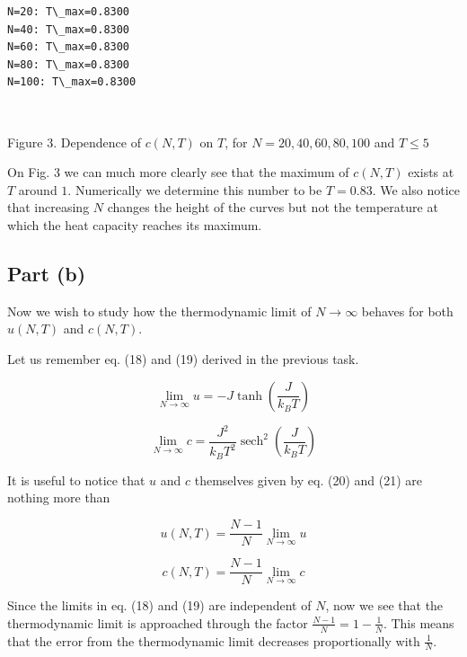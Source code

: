 ﻿\documentclass[11pt]{article}
\begin{document}
    \begin{Verbatim}[commandchars=\\\{\}]
N=20: T\_max=0.8300
N=40: T\_max=0.8300
N=60: T\_max=0.8300
N=80: T\_max=0.8300
N=100: T\_max=0.8300
    \end{Verbatim}

    \begin{center}
    \end{center}
    { \hspace*{\fill} \\}
    
    Figure 3. Dependence of \(c(N,T)\) on \(T\), for \(N=20,40,60,80,100\)
and \(T\le 5\)

    On Fig. 3 we can much more clearly see that the maximum of \(c(N,T)\)
exists at \(T\) around \(1\). Numerically we determine this number to be
\(T=0.83\). We also notice that increasing \(N\) changes the height of
the curves but not the temperature at which the heat capacity reaches
its maximum.

    \subsection*{Part (b)}

Now we wish to study how the thermodynamic limit of \(N \to \infty\)
behaves for both \(u(N,T)\) and \(c(N,T)\).

Let us remember eq. (18) and (19) derived in the previous task.

\[\lim_{N \to \infty} u= -J\tanh\left(\frac{J}{k_B T}\right)\]

\[\lim_{N \to \infty} c=\frac{J^2}{k_B T^2}\operatorname{sech}^2\left(\frac{J}{k_B T}\right)\]

It is useful to notice that \(u\) and \(c\) themselves given by eq. (20)
and (21) are nothing more than

\[u(N,T)=\frac{N-1}{N} \lim_{N \to \infty} u\]

\[c(N,T)=\frac{N-1}{N} \lim_{N \to \infty} c\]

Since the limits in eq. (18) and (19) are independent of \(N\), now we
see that the thermodynamic limit is approached through the factor
\(\frac{N-1}{N}=1-\frac{1}{N}\). This means that the error from the
thermodynamic limit decreases proportionally with \(\frac{1}{N}\).


    
    
    
\end{document}
